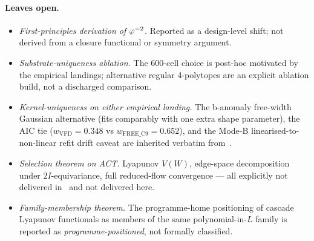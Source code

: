 \paragraph{Leaves open.}
\begin{itemize}\itemsep=2pt
\item \emph{First-principles derivation of $\varphi^{-2}$.} Reported
  as a design-level shift; not derived from a closure functional
  or symmetry argument.
\item \emph{Substrate-uniqueness ablation.} The 600-cell choice is
  post-hoc motivated by the empirical landings; alternative regular
  4-polytopes are an explicit ablation build, not a discharged
  comparison.
\item \emph{Kernel-uniqueness on either empirical landing.} The
  b-anomaly free-width Gaussian alternative (fits comparably with
  one extra shape parameter), the AIC tie
  ($w_{\mathrm{VFD}}=0.348$ vs $w_{\mathrm{FREE\_C9}}=0.652$), and
  the Mode-B linearised-to-non-linear refit drift caveat are
  inherited verbatim from~\citep{SmartBAnomaly2026}.
\item \emph{Selection theorem on ACT.} Lyapunov $V(W)$, edge-space
  decomposition under $2I$-equivariance, full reduced-flow
  convergence — all explicitly not delivered
  in~\citep{SmartAdaptiveClosureTransport2026} and not delivered
  here.
\item \emph{Family-membership theorem.} The programme-home
  positioning of cascade Lyapunov functionals as members of the
  same polynomial-in-$L$ family is reported as
  \emph{programme-positioned}, not formally classified.
\end{itemize}
